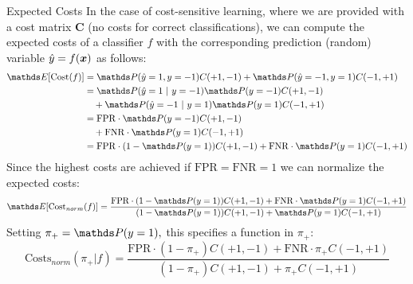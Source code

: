 	\begin{frame}{Expected Costs}
	\footnotesize
%			
			In the case of cost-sensitive learning, where we are provided with a cost matrix $\mathbf{C}$ (no costs for correct classifications), we can compute the expected costs of a classifier $f$ with the corresponding prediction (random) variable $\hat{y} = f(\bm{x})$ as follows:
%			
			\begin{align*}
%				
				\E[ \mathrm{Cost}(f) ] 
%
				&= \P(\yh=1, y=-1) C(+1,-1) + \P(\yh= - 1, y=1) C(-1,+1) \\
%
				&= \P(\yh=1~|~ y=-1) \P(y=-1) C(+1,-1)  \\
				&\quad + \P(\yh = - 1 ~|~ y=1) \P(y=1) C(-1,+1) \\
%				
				&= \mathrm{FPR }\cdot \P(y=-1) C(+1,-1) \\
%				
				&\quad + \mathrm{FNR}\cdot  \P(y=1) C(-1,+1) \\
%				
				&= \mathrm{FPR }\cdot (1- \P(y=1)) C(+1,-1) + \mathrm{FNR}\cdot  \P(y=1) C(-1,+1)
%				
			\end{align*}
%			
		Since the highest costs are achieved if $\mathrm{FPR } = \mathrm{FNR } = 1$ we can normalize the expected costs:
%		
		$$  \E[ \mathrm{Cost}_{norm}(f) ] = \frac{\mathrm{FPR }\cdot (1- \P(y=1)) C(+1,-1) + \mathrm{FNR}\cdot  \P(y=1) C(-1,+1)}{(1- \P(y=1)) C(+1,-1) + \P(y=1) C(-1,+1)} $$
%
		Setting $\pi_+ =  \P(y=1),$ this specifies a function in $\pi_+:$
%		
		$$  \mathrm{Costs}_{norm}(\pi_+ | f) = \frac{\mathrm{FPR }\cdot (1- \pi_+) C(+1,-1) + \mathrm{FNR}\cdot  \pi_+ C(-1,+1)}{(1- \pi_+) C(+1,-1) + \pi_+ C(-1,+1)}  $$
	\end{frame}
	
